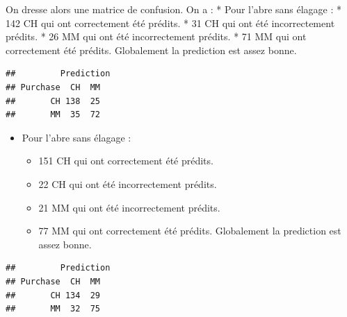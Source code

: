 \documentclass[]{article}
\newenvironment{Shaded}{\begin{snugshade}}{\end{snugshade}}
\newcommand{\DataTypeTok}[1]{\textcolor[rgb]{0.13,0.29,0.53}{#1}}
\newcommand{\FloatTok}[1]{\textcolor[rgb]{0.00,0.00,0.81}{#1}}
\newcommand{\KeywordTok}[1]{\textcolor[rgb]{0.13,0.29,0.53}{\textbf{#1}}}
\newcommand{\NormalTok}[1]{#1}
\newcommand{\OperatorTok}[1]{\textcolor[rgb]{0.81,0.36,0.00}{\textbf{#1}}}
\newcommand{\StringTok}[1]{\textcolor[rgb]{0.31,0.60,0.02}{#1}}
\providecommand{\tightlist}{%
  \setlength{\itemsep}{0pt}\setlength{\parskip}{0pt}}
\begin{document}
On dresse alors une matrice de confusion. On a : * Pour l'abre sans
élagage : * 142 CH qui ont correctement été prédits. * 31 CH qui ont été
incorrectement prédits. * 26 MM qui ont été incorrectement prédits. * 71
MM qui ont correctement été prédits. Globalement la prediction est assez
bonne.

\begin{Shaded}
\end{Shaded}

\begin{verbatim}
##         Prediction
## Purchase  CH  MM
##       CH 138  25
##       MM  35  72
\end{verbatim}

\begin{itemize}
\tightlist
\item
  Pour l'abre sans élagage :

  \begin{itemize}
  \tightlist
  \item
    151 CH qui ont correctement été prédits.
  \item
    22 CH qui ont été incorrectement prédits.
  \item
    21 MM qui ont été incorrectement prédits.
  \item
    77 MM qui ont correctement été prédits. Globalement la prediction
    est assez bonne.
  \end{itemize}
\end{itemize}

\begin{Shaded}
\end{Shaded}

\begin{verbatim}
##         Prediction
## Purchase  CH  MM
##       CH 134  29
##       MM  32  75
\end{verbatim}
\end{document}
